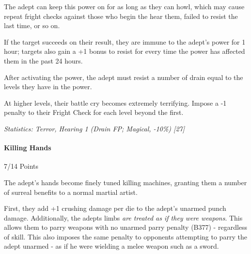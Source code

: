 \begin{multicols}{3}
		The adept can keep this power on for as long as they can howl, which may cause repeat fright checks against those who begin the hear them, failed to resist the last time, or so on.
		
		If the target succeeds on their result, they are immune to the adept’s power for 1 hour; targets also gain a +1 bonus to resist for every time the power has affected them in the past 24 hours. 
		
		After activating the power, the adept must resist a number of drain equal to the levels they have in the power.
		
		At higher levels, their battle cry becomes extremely terrifying. Impose a -1 penalty to their Fright Check for each level beyond the first.

		\begin{center} 
			\begin{adjustwidth}{-0mm}{}
			\end{adjustwidth}
		\end{center}
	
		\textcolor{OliveGreen}{\textit{Statistics: Terror, Hearing 1 (Drain FP; Magical, -10\%) [27]}}
	
	\paragraph{Killing Hands}
	\begin{flushright}
		7/14 Points
	\end{flushright}

		The adept's hands become finely tuned killing machines, granting them a number of surreal benefits to a normal martial artist.
		
		First, they add +1 crushing damage per die to the adept's unarmed punch damage. Additionally, the adepts limbs \textit{are treated as if they were weapons}. This allows them to parry weapons with no unarmed parry penalty (B377) - regardless of skill. This also imposes the same penalty to opponents attempting to parry the adept unarmed - as if he were wielding a melee weapon such as a sword. 
		

\end{multicols}
